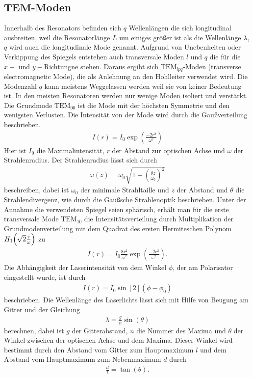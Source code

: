 \subsection[TEM-Moden]{$\mathbf{TEM}$-Moden}
Innerhalb des Resonators befinden sich $q$ Wellenlängen die sich longitudinal ausbreiten, weil die Resonatorlänge $L$ um einiges größer ist als die Wellenlänge $\lambda$, $q$ wird auch die longitudinale Mode genannt. Aufgrund von Unebenheiten oder Verkippung des Spiegels entstehen auch transversale Moden $l$ und $q$ die für die $x-$ und $y-$Richtungne stehen. Daraus ergibt sich $\mathrm{TEM}_{lpq}$-Moden (transverse electromagnetic Mode), die als Anlehnung an den Hohlleiter verwendet wird. Die Modenzahl $q$ kann meistens Weggelassen werden weil sie von keiner Bedeutung ist. In den meisten Resonatoren werden nur wenige Moden isoliert und verstärkt.\\
Die Grundmode $\mathrm{TEM}_{00}$ ist die Mode mit der höchsten Symmetrie und den wenigsten Verlusten. Die Intensität von der Mode wird durch die Gaußverteilung beschrieben.
\begin{align}
I(r)=I_0\exp\left(\frac{-2r^2}{\omega^2}\right)
\label{eq:tem00}
\end{align}
Hier ist $I_0$ die Maximalintensität, $r$ der Abstand zur optischen Achse und $\omega$ der Strahlenradius. Der Strahlenradius lässt sich durch
\begin{align}
\omega(z)=\omega_0 \sqrt{1+\left(\frac{\theta z}{\omega_0}\right)^2}
\end{align}
beschreiben, dabei ist $\omega_0$ der minimale Strahltaille und $z$ der Abstand und $\theta$ die Strahlendivergenz, wie durch die Gaußsche 
Strahlenoptik beschrieben.
Unter der Annahme die verwendeten Spiegel seien sphärisch, erhält man für die erste transversale Mode $\mathrm{TEM}_{10}$ 
die Intensitätsverteilung durch Multiplikation der Grundmodenverteilung mit dem Quadrat des ersten Hermiteschen Polynom\footnotemark $H_1\qty(\sqrt{2}\frac{r}{\omega})$\cite{Demtroeder07}
zu
\begin{align}
I(r)=I_0\frac{8r^2}{\omega^2}\exp\left(\frac{-2r^2}{\omega^2}\right).
\label{eq:tem10}
\end{align}
Die Abhängigkeit der Laserintensität von dem Winkel $\phi$, der am Polarisator eingestellt wurde, ist durch
\begin{align}
I(r)=I_0\sin[2](\phi - \phi_0)
\label{eq:polarisation}
\end{align}
beschrieben. 
Die Wellenlänge des Laserlichts lässt sich mit Hilfe von Beugung am Gitter und der Gleichung
\begin{align}
\lambda=\frac{g}{n}\sin\left(  \theta \right)
\label{eq:gitter}
\end{align}
berechnen, dabei ist $g$ der Gitterabstand, $n$ die Nummer des Maxima und $\theta$ der Winkel zwischen der optischen Achse und dem Maxima. Dieser Winkel wird bestimmt durch den Abstand vom Gitter zum Hauptmaximum $l$ und dem Abstand vom  Hauptmaximum zum Nebenmaximum $d$ durch
\begin{align}
\frac{d}{l}=\tan\left( \theta \right).
\label{eq:gitter_winkel}
\end{align}


